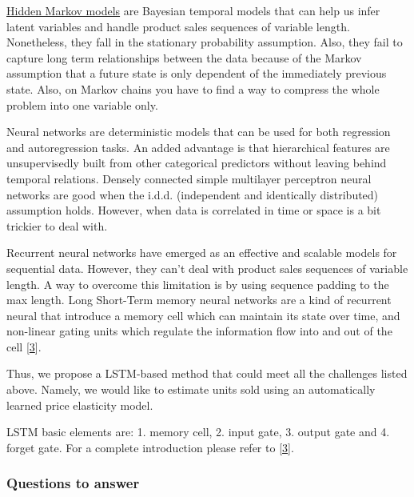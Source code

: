 \documentclass[]{article}
\theoremstyle{definition}
\theoremstyle{definition}
\theoremstyle{definition}
\theoremstyle{remark}
\begin{document}
\href{https://en.wikipedia.org/wiki/Hidden_Markov_model}{Hidden Markov
models} are Bayesian temporal models that can help us infer latent
variables and handle product sales sequences of variable length.
Nonetheless, they fall in the stationary probability assumption. Also,
they fail to capture long term relationships between the data because of
the Markov assumption that a future state is only dependent of the
immediately previous state. Also, on Markov chains you have to find a
way to compress the whole problem into one variable only.

Neural networks are deterministic models that can be used for both
regression and autoregression tasks. An added advantage is that
hierarchical features are unsupervisedly built from other categorical
predictors without leaving behind temporal relations. Densely connected
simple multilayer perceptron neural networks are good when the i.d.d.
(independent and identically distributed) assumption holds. However,
when data is correlated in time or space is a bit trickier to deal with.

Recurrent neural networks have emerged as an effective and scalable
models for sequential data. However, they can't deal with product sales
sequences of variable length. A way to overcome this limitation is by
using sequence padding to the max length. Long Short-Term memory neural
networks are a kind of recurrent neural that introduce a memory cell
which can maintain its state over time, and non-linear gating units
which regulate the information flow into and out of the cell
{[}\protect\hyperlink{ref-Greff2017}{3}{]}.

Thus, we propose a LSTM-based method that could meet all the challenges
listed above. Namely, we would like to estimate units sold using an
automatically learned price elasticity model.

LSTM basic elements are: 1. memory cell, 2. input gate, 3. output gate
and 4. forget gate. For a complete introduction please refer to
{[}\protect\hyperlink{ref-Greff2017}{3}{]}.

\subsubsection{Questions to answer}\label{questions-to-answer}
\end{document}
